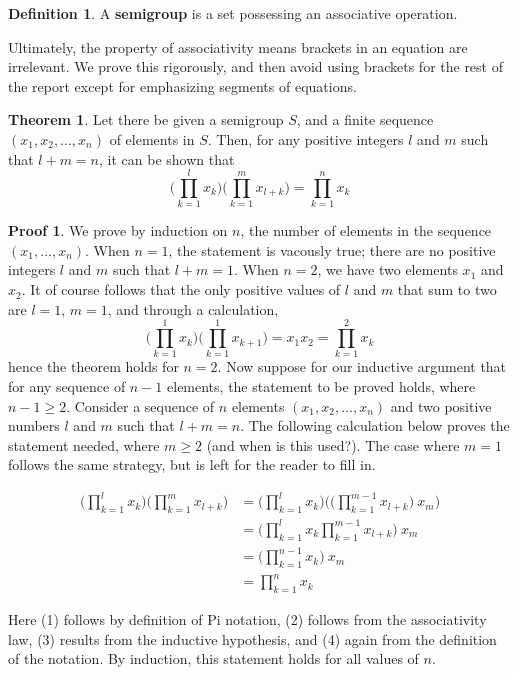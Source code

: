 \documentclass[12pt]{amsbook}
\theoremstyle{definition}
\newtheorem{theorem}{Theorem}[chapter]
\newtheorem{definition}{Definition}
\newtheorem*{prf}{Proof}
\begin{document}
\begin{definition}
    A {\bf semigroup} is a set possessing an associative operation.
\end{definition}

Ultimately, the property of associativity means brackets in an equation are irrelevant. We prove this rigorously, and then avoid using brackets for the rest of the report except for emphasizing segments of equations.

\begin{theorem}
Let there be given a semigroup $S$, and a finite sequence $(x_1, x_2, \dots, x_n)$ of elements in $S$. Then, for any positive integers $l$ and $m$ such that $l + m = n$, it can be shown that
%
\[ \big( \prod_{k=1}^l x_k \big) \big( \prod_{k=1}^m x_{l + k} \big) = \prod_{k=1}^n x_k \]
\end{theorem}
\begin{prf}
    We prove by induction on $n$, the number of elements in the sequence $(x_1, \dots, x_n)$. When $n = 1$, the statement is vacously true; there are no positive integers $l$ and $m$ such that $l + m = 1$. When $n = 2$, we have two elements $x_1$ and $x_2$. It of course follows that the only positive values of $l$ and $m$ that sum to two are $l = 1$, $m = 1$, and through a calculation,
    \[ \big( \prod_{k=1}^1 x_k \big) \big( \prod_{k=1}^1 x_{k+1} \big) = x_1 x_2 = \prod_{k=1}^2 x_k \]
    hence the theorem holds for $n = 2$. Now suppose for our inductive argument that for any sequence of $n-1$ elements, the statement to be proved holds, where $n-1 \geq 2$. Consider a sequence of $n$ elements $(x_1, x_2, \dots, x_n)$ and two positive numbers $l$ and $m$ such that $l + m = n$. The following calculation below proves the statement needed, where $m \geq 2$ (and when is this used?). The case where $m = 1$ follows the same strategy, but is left for the reader to fill in.

    \begin{align}
        \big( \prod_{k=1}^l x_k \big) \big( \prod_{k=1}^m x_{l + k} \big) &= \big( \prod_{k=1}^l x_k \big) \big( \big( \prod_{k=1}^{m-1} x_{l + k} \big)\ x_m \big)\\
        &= \big( \prod_{k=1}^l x_k \prod_{k=1}^{m-1} x_{l + k} \big)\ x_m\\
        &= \big( \prod_{k=1}^{n-1} x_k \big)\ x_m\\
        &= \prod_{k=1}^n x_k
    \end{align}

    Here (1) follows by definition of Pi notation, (2) follows from the associativity law, (3) results from the inductive hypothesis, and (4) again from the definition of the notation. By induction, this statement holds for all values of $n$.
\end{prf}
\end{document}
